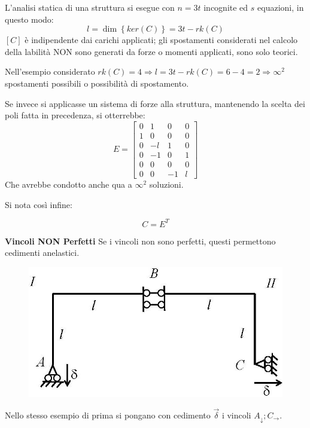 \documentclass{article}
\begin{document}
\begin{adjustwidth}{2in}{}
L'analisi statica di una struttura si esegue con $n=3t$ incognite ed $s$ equazioni, in questo modo: 
\[
l = \dim\left\lbrace ker(C) \right\rbrace = 3t - rk(C)
\]		
$[C]$	 è indipendente dai carichi applicati; gli spostamenti considerati nel calcolo della labilità NON sono generati da forze o momenti applicati, sono solo teorici. 

Nell'esempio considerato $rk(C) = 4 \Rightarrow l = 3t - rk(C) = 6-4 = 2 \Rightarrow \infty^2$ spostamenti possibili o possibilità di spostamento. 

Se invece si applicasse un sistema di forze alla struttura, mantenendo la scelta dei poli fatta in precedenza, si otterrebbe: 
\[
E = \left[\begin{array}{cccc}
	0 & 1 & 0 & 0 \\
	1 & 0 & 0 & 0 \\
	0 & -l & 1 & 0 \\
	0 & -1 & 0 & 1 \\
	0 & 0 & 0 & 0 \\
	0 & 0 & -1 & l
\end{array} \right] 
\]	
Che avrebbe condotto anche qua a $\infty^2$ soluzioni. 

Si nota così infine:

\[
C = E^T
\]


\newpage
{\Large \textbf{Vincoli NON Perfetti}} \mbox{} \newline			
Se i vincoli non sono perfetti, questi permettono cedimenti anelastici. 
\begin{figure}[H]
	\centering
	\includegraphics[width=0.15\linewidth]{immagini/1.PARTE2_Pagina_31}
\end{figure}
Nello stesso esempio di prima si pongano con cedimento $\vec{\delta}$ i vincoli $A_{\downarrow}; C_{\rightarrow}$. 


\end{adjustwidth}
\end{document}
